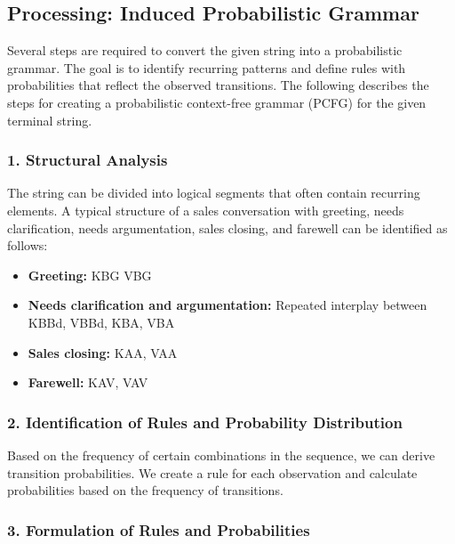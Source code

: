 \documentclass[
]{article}
\begin{document}
\subsection{Processing: Induced Probabilistic Grammar}\label{processing-induced-probabilistic-grammar}

Several steps are required to convert the given string into a probabilistic grammar. The goal is to identify recurring patterns and define rules with probabilities that reflect the observed transitions. The following describes the steps for creating a probabilistic context-free grammar (PCFG) for the given terminal string.

\subsubsection{1. Structural Analysis}\label{structural-analysis}

The string can be divided into logical segments that often contain recurring elements. A typical structure of a sales conversation with greeting, needs clarification, needs argumentation, sales closing, and farewell can be identified as follows:

\begin{itemize}
\item \textbf{Greeting:} KBG VBG
\item \textbf{Needs clarification and argumentation:} Repeated interplay between KBBd, VBBd, KBA, VBA
\item \textbf{Sales closing:} KAA, VAA
\item \textbf{Farewell:} KAV, VAV
\end{itemize}

\subsubsection{2. Identification of Rules and Probability Distribution}\label{identification-of-rules-and-probability-distribution}

Based on the frequency of certain combinations in the sequence, we can derive transition probabilities. We create a rule for each observation and calculate probabilities based on the frequency of transitions.

\subsubsection{3. Formulation of Rules and Probabilities}\label{formulation-of-rules-and-probabilities}
\end{document}
